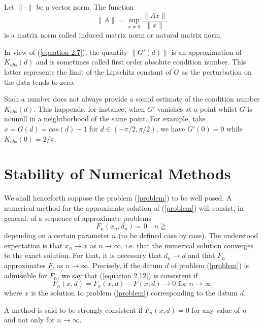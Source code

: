 \begin{theorem}
    Let $\| \cdot \|$ be a vector norm. The function
    \begin{equation}
        \| A \| = \sup_{x \neq 0} \frac{\| A x \|}{\|x \|}
        \label{equation 1.19}
    \end{equation}
    is a matrix norm called induced matrix norm or natural matrix norm.
\end{theorem}

In view of (\ref{equation 2.7}), the quantity $\| G'(d) \|$ is an approximation of $K_{abs}(d)$ and is sometimes called first order absolute condition number. This latter represents the limit of the Lipschitz constant of $G$ as the perturbation on the data tends to zero.

Such a number does not always provide a sound estimate of the condition number $K_{abs}(d)$. This happends, for instance, when $G'$ vanishes at a point whilst $G$ is nonnull in a neightborhood of the same point. For example, take $x = G(d) = cos(d) - 1$ for $d \in (- \pi / 2, \pi / 2)$, we have $G'(0) = 0$ while $K_{abs}(0) = 2/\pi$.

\section{Stability of Numerical Methods}
We shall henceforth suppose the problem (\ref{problem}) to be well posed. A numerical method for the approximate solution of (\ref{problem}) will consist, in general, of a sequence of approximate problems
\begin{equation}
    F_n (x_n, d_n) = 0 \quad n \geqq
    \label{equation 2.12}
\end{equation}
depending on a certain parameter $n$ (to be defined case by case). The understood expectation is that $x_n \rightarrow x$ as $n \rightarrow \infty$, i.e. that the numerical solution converges to the exact solution. For that, it is necessary that $d_n \rightarrow d$ and that $F_n$ approximates $F$, as $n \rightarrow \infty$. Precisely, if the datum $d$ of problem (\ref{problem}) is admissible for $F_n$, we say that (\ref{equation 2.12}) is consistent if 
\begin{equation}
    F_n(x,d) = F_n (x,d) - F(x,d) \rightarrow 0 \text{ for } n \rightarrow \infty
    \label{equation 2.13}
\end{equation}
where $x$ is the solution to problem (\ref{problem}) corresponding to the datum $d$.

A method is said to be strongly consistent if $F_n(x,d) = 0$ for any value of $n$ and not only for $n \rightarrow \infty$.

